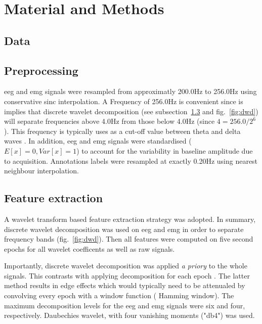 
\section{Material and Methods} \label{matmet}


\subsection{Data}


\subsection{Preprocessing}

\gls{eeg} and \gls{emg} signals were resampled from approximatly 200.0Hz to 256.0Hz using
conservative sinc interpolation. 
A Frequency of 256.0Hz is convenient since is implies that discrete wavelet decomposition (see subsection~\ref{sub:features} and fig.~\ref{fig:dwd}) will separate 
frequencies above 4.0Hz from those below 4.0Hz (since $4 = 256.0/{2^6} $).
This frequency is typically uses as a cut-off value between theta and delta waves \citationneeded{}.
In addition, \gls{eeg} and \gls{emg} signals were standardised ($E[x] = 0, Var[x] = 1$) to account for the variability in baseline amplitude due to acquisition.
Annotations labels were resampled at exactly 0.20Hz using nearest neighbour interpolation.

\subsection{Feature extraction}
\label{sub:features}

A wavelet transform based feature extraction strategy was adopted.
In summary, discrete wavelet decomposition was used on \gls{eeg} and \gls{emg} 
in order to separate frequency bands (fig.~\ref{fig:dwd}).
Then all features were computed on five second epochs for all wavelet coefficents as well as raw signals.




Importantly, discrete wavelet decomposition was applied \emph{a priory} to the whole signals.
This contrasts with applying decomposition for each epoch \citationneeded{}.
The latter method results in edge effects which would typically need to be attenualed by convolving every epoch with a window function (\eg{} Hamming window).
The maximum decomposition levels for the \gls{eeg} and \gls{emg} signals were six and four, respectively.
Daubechies wavelet, with four vanishing moments ("db4") was used.

